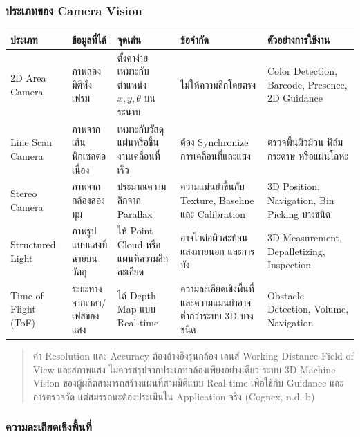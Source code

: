 \subsubsection{ประเภทของ Camera Vision}

\begin{table}[htbp]
    \centering
    \small
    \begin{tabularx}{\textwidth}{L{0.14\textwidth} L{0.16\textwidth} Y Y L{0.18\textwidth}}
        \hline
        \textbf{ประเภท} & \textbf{ข้อมูลที่ได้} & \textbf{จุดเด่น} & \textbf{ข้อจำกัด} & \textbf{ตัวอย่างการใช้งาน} \\
        \hline
        2D Area Camera & ภาพสองมิติทั้งเฟรม & ตั้งค่าง่าย เหมาะกับตำแหน่ง $x,y,\theta$ บนระนาบ & ไม่ให้ความลึกโดยตรง & Color Detection, Barcode, Presence, 2D Guidance \\
        Line Scan Camera & ภาพจากเส้นพิกเซลต่อเนื่อง & เหมาะกับวัสดุแผ่นหรือชิ้นงานเคลื่อนที่เร็ว & ต้อง Synchronize การเคลื่อนที่และแสง & ตรวจพื้นผิวม้วน ฟิล์ม กระดาษ หรือแผ่นโลหะ \\
        Stereo Camera & ภาพจากกล้องสองมุม & ประมาณความลึกจาก Parallax & ความแม่นยำขึ้นกับ Texture, Baseline และ Calibration & 3D Position, Navigation, Bin Picking บางชนิด \\
        Structured Light & ภาพรูปแบบแสงที่ฉายบนวัตถุ & ให้ Point Cloud หรือแผนที่ความลึกละเอียด & อาจไวต่อผิวสะท้อน แสงภายนอก และการบัง & 3D Measurement, Depalletizing, Inspection \\
        Time of Flight (ToF) & ระยะทางจากเวลา/เฟสของแสง & ได้ Depth Map แบบ Real-time & ความละเอียดเชิงพื้นที่และความแม่นยำอาจต่ำกว่าระบบ 3D บางชนิด & Obstacle Detection, Volume, Navigation \\
        \hline
    \end{tabularx}
\end{table}

\begin{quote}
ค่า Resolution และ Accuracy ต้องอ้างอิงรุ่นกล้อง เลนส์ Working Distance Field of View และสภาพแสง ไม่ควรสรุปจากประเภทกล้องเพียงอย่างเดียว ระบบ 3D Machine Vision ของผู้ผลิตสามารถสร้างแผนที่สามมิติแบบ Real-time เพื่อใช้กับ Guidance และการตรวจวัด แต่สมรรถนะต้องประเมินใน Application จริง (Cognex, n.d.-b)
\end{quote}

\subsubsection{ความละเอียดเชิงพื้นที่}

